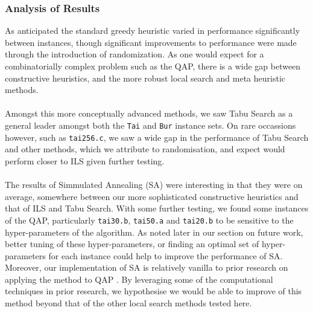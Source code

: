 \documentclass[a4paper,10pt]{article}
\begin{document}
\subsubsection*{Analysis of Results}

As anticipated the standard greedy heuristic varied in performance significantly between instances, though significant improvements to performance were made through the introduction of randomization. As one would expect for a combinatorially complex problem such as the QAP, there is a wide gap between constructive heuristics, and the more robust local search and meta heuristic methods. \\
\\
Amongst this more conceptually advanced methods, we saw Tabu Search as a general leader amongst both the \texttt{Tai} and \texttt{Bur} instance sets. On rare occassions however, such as \texttt{tai256.c}, we saw a wide gap in the performance of Tabu Search and other methods, which we attribute to randomisation, and expect would perform closer to ILS given further testing. \\
\\
The results of Simmulated Annealing (SA) were interesting in that they were on average, somewhere between our more sophisticated constructive heuristics and that of ILS and Tabu Search. With some further testing, we found some instances of the QAP, particularly \texttt{tai30.b}, \texttt{tai50.a} and \texttt{tai20.b} to be sensitive to the hyper-parameters of the algorithm. As noted later in our section on future work, better tuning of these hyper-parameters, or finding an optimal set of hyper-parameters for each instance could help to improve the performance of SA. Moreover, our implementation of SA is relatively vanilla to prior research on applying the method to QAP \cite{SAReview}. By leveraging some of the computational techniques in prior research, we hypothesise we would be able to improve of this method beyond that of the other local search methods tested here. 
\end{document}
